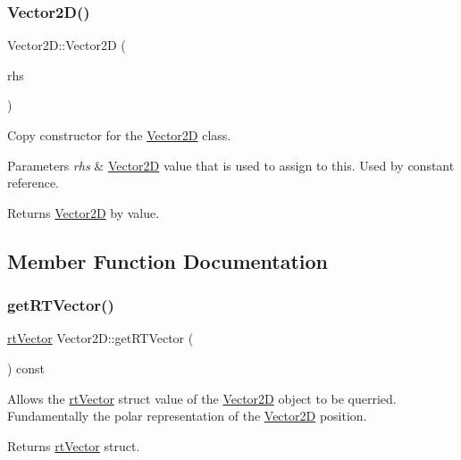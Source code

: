 \subsubsection{\texorpdfstring{Vector2\+D()}{Vector2D()}\hspace{0.1cm}{\footnotesize\ttfamily [5/5]}}
{\footnotesize\ttfamily Vector2\+D\+::\+Vector2D (\begin{DoxyParamCaption}\item[{const \hyperlink{class_vector2_d}{Vector2D} \&}]{rhs }\end{DoxyParamCaption})}



Copy constructor for the \hyperlink{class_vector2_d}{Vector2D} class. 


\begin{DoxyParams}{Parameters}
{\em rhs} & \hyperlink{class_vector2_d}{Vector2D} value that is used to assign to this. Used by constant reference. \\
\hline
\end{DoxyParams}
\begin{DoxyReturn}{Returns}
\hyperlink{class_vector2_d}{Vector2D} by value. 
\end{DoxyReturn}


\subsection{Member Function Documentation}
\mbox{\label{class_vector2_d_a2760dd54ac65996966d1b9077cbecb06}} 
\subsubsection{\texorpdfstring{get\+R\+T\+Vector()}{getRTVector()}}
{\footnotesize\ttfamily \hyperlink{structrt_vector}{rt\+Vector} Vector2\+D\+::get\+R\+T\+Vector (\begin{DoxyParamCaption}{ }\end{DoxyParamCaption}) const}



Allows the \hyperlink{structrt_vector}{rt\+Vector} struct value of the \hyperlink{class_vector2_d}{Vector2D} object to be querried. Fundamentally the polar representation of the \hyperlink{class_vector2_d}{Vector2D} position. 

\begin{DoxyReturn}{Returns}
\hyperlink{structrt_vector}{rt\+Vector} struct. 
\end{DoxyReturn}
\mbox{\label{class_vector2_d_a4bc415751c246ae44727ef4f6b80d80c}} 
